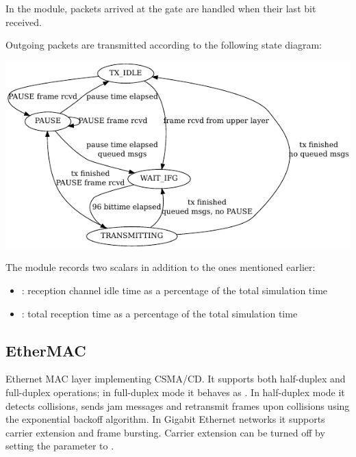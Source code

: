 
In the  module,
packets arrived at the  gate are handled when their last bit received.

Outgoing packets are transmitted according to the following state diagram:

\begin{center}
\includegraphics{figures/EtherMACFullDuplex_txstates}
\end{center}

The  module records two scalars in addition to the
ones mentioned earlier:
\begin{itemize}
\item {}: reception channel idle time
        as a percentage of the total simulation time
\item {}: total reception
        time as a percentage of the total simulation time
\end{itemize}

\subsection{EtherMAC}

Ethernet MAC layer implementing CSMA/CD. It supports both half-duplex and full-duplex operations;
in full-duplex mode it behaves as . In half-duplex  mode
it detects collisions, sends jam messages and retransmit frames upon collisions using
the exponential backoff algorithm. In Gigabit Ethernet networks it supports carrier
extension and frame bursting. Carrier extension can be turned off by setting the
 parameter to .

